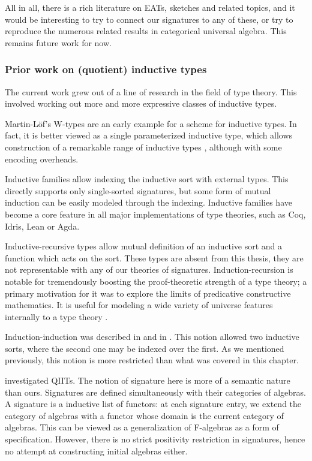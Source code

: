 \documentclass[12pt,a4paper,twoside,openany]{book}
\theoremstyle{remark}
\theoremstyle{definition}
\theoremstyle{theorem}
\begin{document}
All in all, there is a rich literature on EATs, sketches and related topics, and
it would be interesting to try to connect our signatures to any of these, or try
to reproduce the numerous related results in categorical universal algebra. This
remains future work for now.

\subsubsection{Prior work on (quotient) inductive types}

The current work grew out of a line of research in the field of type
theory. This involved working out more and more expressive classes of inductive
types.

Martin-Löf's W-types \cite{martinlof84sambin} are an early example for a scheme
for inductive types. In fact, it is better viewed as a single parameterized
inductive type, which allows construction of a remarkable range of inductive
types \cite{whynotw}, although with some encoding overheads.

Inductive families \cite{inductivefamilies} allow indexing the inductive sort
with external types. This directly supports only single-sorted signatures, but
some form of mutual induction can be easily modeled through the
indexing. Inductive families have become a core feature in all major
implementations of type theories, such as Coq, Idris, Lean or Agda.

Inductive-recursive types \cite{dybjer99finite} allow mutual definition of an
inductive sort and a function which acts on the sort. These types are absent
from this thesis, they are not representable with any of our theories of
signatures. Induction-recursion is notable for tremendously boosting the
proof-theoretic strength of a type theory; a primary motivation for it was to
explore the limits of predicative constructive mathematics. It is useful for
modeling a wide variety of universe features internally to a type theory
\cite{kovacs2021generalized}.

Induction-induction was described in \cite{altenkirch11ii} and in
\cite{forsberg-phd}. This notion allowed two inductive sorts, where the second
one may be indexed over the first. As we mentioned previously, this notion is
more restricted than what was covered in this chapter.

\cite{altenkirch18qiit} investigated QIITs. The notion of signature
here is more of a semantic nature than ours. Signatures are defined
simultaneously with their categories of algebras. A signature is a inductive
list of functors: at each signature entry, we extend the category of algebras
with a functor whose domain is the current category of algebras. This can be
viewed as a generalization of F-algebras as a form of specification. However,
there is no strict positivity restriction in signatures, hence no attempt at
constructing initial algebras either.
\end{document}
